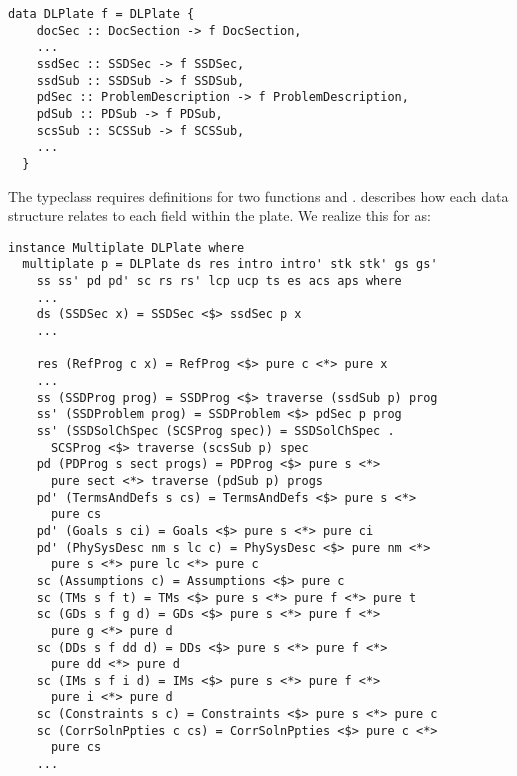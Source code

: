 \begin{tcolorbox}[breakable, toprule at break=0pt, bottomrule at break=0pt]
\begin{verbatim}
data DLPlate f = DLPlate {
    docSec :: DocSection -> f DocSection,
    ...
    ssdSec :: SSDSec -> f SSDSec,
    ssdSub :: SSDSub -> f SSDSub,
    pdSec :: ProblemDescription -> f ProblemDescription,
    pdSub :: PDSub -> f PDSub,
    scsSub :: SCSSub -> f SCSSub,
    ...
  }
\end{verbatim}
\end{tcolorbox}

The  typeclass requires definitions for two functions  and .  describes how each data structure relates to each field within the plate. We realize this for  as:

\begin{tcolorbox}[breakable, toprule at break=0pt, bottomrule at break=0pt]
\begin{verbatim}
instance Multiplate DLPlate where
  multiplate p = DLPlate ds res intro intro' stk stk' gs gs'
    ss ss' pd pd' sc rs rs' lcp ucp ts es acs aps where
    ...
    ds (SSDSec x) = SSDSec <$> ssdSec p x
    ...

    res (RefProg c x) = RefProg <$> pure c <*> pure x
    ...
    ss (SSDProg prog) = SSDProg <$> traverse (ssdSub p) prog
    ss' (SSDProblem prog) = SSDProblem <$> pdSec p prog
    ss' (SSDSolChSpec (SCSProg spec)) = SSDSolChSpec .
      SCSProg <$> traverse (scsSub p) spec
    pd (PDProg s sect progs) = PDProg <$> pure s <*>
      pure sect <*> traverse (pdSub p) progs
    pd' (TermsAndDefs s cs) = TermsAndDefs <$> pure s <*>
      pure cs
    pd' (Goals s ci) = Goals <$> pure s <*> pure ci
    pd' (PhySysDesc nm s lc c) = PhySysDesc <$> pure nm <*>
      pure s <*> pure lc <*> pure c
    sc (Assumptions c) = Assumptions <$> pure c
    sc (TMs s f t) = TMs <$> pure s <*> pure f <*> pure t
    sc (GDs s f g d) = GDs <$> pure s <*> pure f <*>
      pure g <*> pure d
    sc (DDs s f dd d) = DDs <$> pure s <*> pure f <*>
      pure dd <*> pure d
    sc (IMs s f i d) = IMs <$> pure s <*> pure f <*>
      pure i <*> pure d
    sc (Constraints s c) = Constraints <$> pure s <*> pure c
    sc (CorrSolnPpties c cs) = CorrSolnPpties <$> pure c <*>
      pure cs
    ...
\end{verbatim}
\end{tcolorbox}

